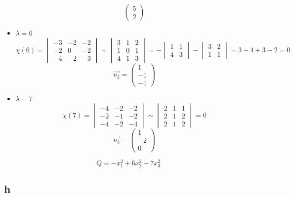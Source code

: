 \begin{itemize}
$$\begin{pmatrix}
        5 \\
        2
    \end{pmatrix} $$
    \item $ \lambda = 6 $
    $$ \chi(6) =
    \begin{vmatrix}
    	-3 & -2 & -2 \\
        -2 & 0 & -2 \\
        -4 & -2 & -3
    \end{vmatrix} \sim
    \begin{vmatrix}
    	3 & 1 & 2 \\
        1 & 0 & 1 \\
        4 & 1 & 3
    \end{vmatrix} = -
    \begin{vmatrix}
    	1 & 1 \\
        4 & 3
    \end{vmatrix} -
    \begin{vmatrix}
    	3 & 2 \\
        1 & 1
    \end{vmatrix} = 3 - 4 + 3 - 2 = 0 $$
    $$ \vec{u_2} =
    \begin{pmatrix}
    	1 \\
        -1 \\
        -1
    \end{pmatrix} $$
    \item $ \lambda = 7 $
    $$ \chi(7) =
    \begin{vmatrix}
    	-4 & -2 & -2 \\
        -2 & -1 & -2 \\
        -4 & -2 & -4
    \end{vmatrix} \sim
    \begin{vmatrix}
    	2 & 1 & 1 \\
        2 & 1 & 2 \\
        2 & 1 & 2
    \end{vmatrix} = 0 $$
    $$ \vec{u_3} =
    \begin{pmatrix}
    	1 \\
        -2 \\
        0
    \end{pmatrix} $$
\end{itemize}
$$ Q = -x_1^2 + 6x_2^2 + 7x_3^2 $$

\subsection{h}

